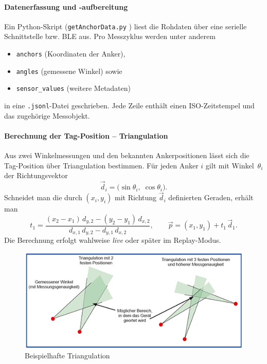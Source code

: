 \documentclass[a4paper, 12pt]{article} %
\begin{document}
\paragraph{Datenerfassung und -aufbereitung}
Ein Python-Skript (\texttt{getAnchorData.py} \cite{tadic-studienarbeit-ui}) liest die Rohdaten über eine serielle Schnittstelle bzw. \ac{BLE} aus.  
Pro Messzyklus werden unter anderem

\begin{itemize}[leftmargin=2em]
  \item \texttt{anchors} (Koordinaten der Anker), 
  \item \texttt{angles} (gemessene Winkel) sowie
  \item \texttt{sensor\_values} (weitere Metadaten)
\end{itemize}

in eine \texttt{.jsonl}-Datei geschrieben. Jede Zeile enthält einen ISO-Zeitstempel und das zugehörige Messobjekt.

\paragraph{Berechnung der Tag-Position – Triangulation}
Aus zwei Winkelmessungen und den bekannten Ankerpositionen lässt sich die Tag-Position über Triangulation bestimmen.  
Für jeden Anker $i$ gilt mit Winkel~$\theta_i$ der Richtungsvektor
\[
  \vec d_i = \bigl(\sin\theta_i,\; \cos\theta_i\bigr).
\]
Schneidet man die durch $(x_i,y_i)$ mit Richtung $\vec d_i$ definierten Geraden, erhält man
\[
  t_1 = \frac{(x_2-x_1) \, d_{y,2} - (y_2-y_1) \, d_{x,2}}{d_{x,1} \, d_{y,2} - d_{y,1} \, d_{x,2}},\qquad
  \vec p = (x_1,y_1) + t_1 \, \vec d_1 .
\]
Die Berechnung erfolgt wahlweise \emph{live} oder später im Replay-Modus.

\begin{figure}[H]
  \centering
  \includegraphics[width=\linewidth]{images/1906_abbildung1.png}
  \caption{Beispielhafte Triangulation \cite{comconsult-wlan-ortung}}
  \label{fig:triangulation_example}
\end{figure}
\end{document}
